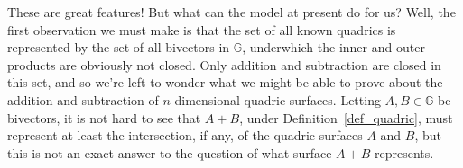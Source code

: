 \documentclass{ecgd-l}
\newcommand{\G}{\mathbb{G}}
\theoremstyle{definition}
\theoremstyle{remark}
\numberwithin{equation}{section}
\begin{document}
These are great features!  But what can the model at present do for us?  Well,
the first observation we must make is that the set of all known quadrics
is represented by the set of all bivectors in $\G$, underwhich the inner
and outer products are obviously not closed.  Only addition and subtraction
are closed in this set, and so we're left to wonder what we might be able
to prove about the addition and subtraction of $n$-dimensional quadric surfaces.
Letting $A,B\in\G$ be bivectors, it is not hard to see that $A+B$, under
Definition~\ref{def_quadric}, must represent at least the intersection, if any,
of the quadric surfaces $A$ and $B$, but this is not an exact answer to the
question of what surface $A+B$ represents.





\end{document}
